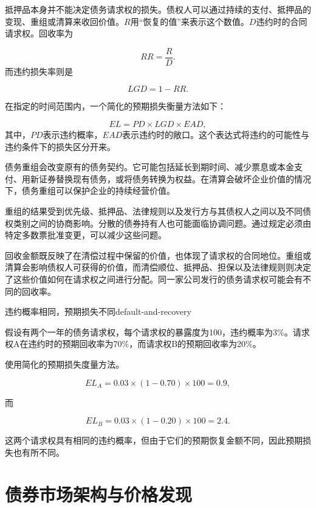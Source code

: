 抵押品本身并不能决定债务请求权的损失。债权人可以通过持续的支付、抵押品的变现、重组或清算来收回价值。$R$用“恢复的值”来表示这个数值。$D$违约时的合同请求权。回收率为

\begin{equation}
RR=\frac{R}{D}.
\label{eq:ch8-recovery-rate}
\end{equation}
而违约损失率则是

\begin{equation}
LGD=1-RR.
\label{eq:ch8-lgd}
\end{equation}

在指定的时间范围内，一个简化的预期损失衡量方法如下：

\begin{equation}
EL=PD\times LGD\times EAD,
\label{eq:ch8-expected-credit-loss}
\end{equation}
其中，$PD$表示违约概率，$EAD$表示违约时的敞口。这个表达式将违约的可能性与违约条件下的损失区分开来。

债务重组会改变原有的债务契约。它可能包括延长到期时间、减少票息或本金支付、用新证券替换现有债务，或将债务转换为权益。在清算会破坏企业价值的情况下，债务重组可以保护企业的持续经营价值。

重组的结果受到优先级、抵押品、法律规则以及发行方与其债权人之间以及不同债权类别之间的协商影响。分散的债券持有人也可能面临协调问题。通过规定必须由特定多数票批准变更，可以减少这些问题。

回收金额既反映了在清偿过程中保留的价值，也体现了请求权的合同地位。重组或清算会影响债权人可获得的价值，而清偿顺位、抵押品、担保以及法律规则则决定了这些价值如何在请求权之间进行分配。同一家公司发行的债务请求权可能会有不同的回收率。

\begin{example}{违约概率相同，预期损失不同}{default-and-recovery}

假设有两个一年的债务请求权，每个请求权的暴露度为100，违约概率为3\%。请求权A在违约时的预期回收率为70\%，而请求权B的预期回收率为20\%。

使用简化的预期损失度量方法。

\[
EL_A=0.03\times(1-0.70)\times100=0.9,
\]

而

\[
EL_B=0.03\times(1-0.20)\times100=2.4.
\]

这两个请求权具有相同的违约概率，但由于它们的预期恢复金额不同，因此预期损失也有所不同。

\end{example}

\section{债券市场架构与价格发现}

